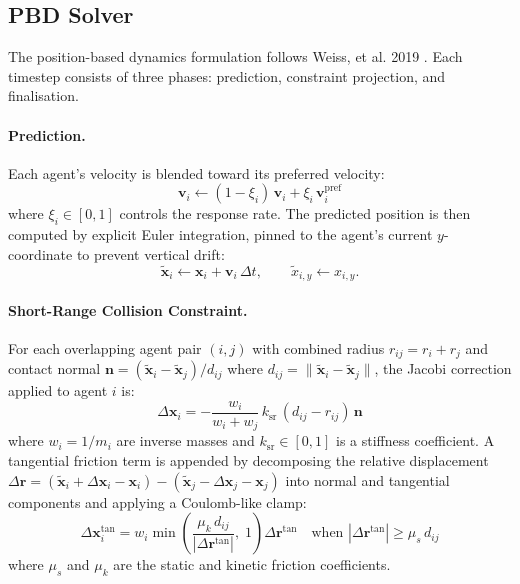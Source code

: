 \subsection{PBD Solver}
\label{sec:pbd_solver}

The position-based dynamics formulation follows Weiss, et al. 2019
\cite{weiss2019}.  Each timestep consists of three phases: prediction,
constraint projection, and finalisation.

\paragraph{Prediction.}
Each agent's velocity is blended toward its preferred velocity:
\begin{equation}
    \mathbf{v}_i \leftarrow (1 - \xi_i)\,\mathbf{v}_i + \xi_i\,\mathbf{v}^{\mathrm{pref}}_i
\end{equation}
where $\xi_i \in [0,1]$ controls the response rate.  The predicted position
is then computed by explicit Euler integration, pinned to the agent's current
$y$-coordinate to prevent vertical drift:
\begin{equation}
    \tilde{\mathbf{x}}_i \leftarrow \mathbf{x}_i + \mathbf{v}_i\,\Delta t, \qquad
    \tilde{x}_{i,y} \leftarrow x_{i,y}.
\end{equation}

\paragraph{Short-Range Collision Constraint.}
For each overlapping agent pair $(i,j)$ with combined radius
$r_{ij} = r_i + r_j$ and contact normal
$\mathbf{n} = (\tilde{\mathbf{x}}_i - \tilde{\mathbf{x}}_j)/d_{ij}$
where $d_{ij} = \|\tilde{\mathbf{x}}_i - \tilde{\mathbf{x}}_j\|$,
the Jacobi correction applied to agent $i$ is:
\begin{equation}
    \Delta\mathbf{x}_i = -\frac{w_i}{w_i + w_j}\,k_{\mathrm{sr}}\,
    (d_{ij} - r_{ij})\,\mathbf{n}
\end{equation}
where $w_i = 1/m_i$ are inverse masses and $k_{\mathrm{sr}} \in [0,1]$ is a
stiffness coefficient.  A tangential friction term is appended by decomposing
the relative displacement $\Delta\mathbf{r} = (\tilde{\mathbf{x}}_i + \Delta\mathbf{x}_i -
\mathbf{x}_i) - (\tilde{\mathbf{x}}_j - \Delta\mathbf{x}_j - \mathbf{x}_j)$
into normal and tangential components and applying a Coulomb-like clamp:
\begin{equation}
    \Delta\mathbf{x}^{\mathrm{tan}}_i =
    w_i \min\!\left(\frac{\mu_k\,d_{ij}}{|\Delta\mathbf{r}^{\mathrm{tan}}|},\;1\right)
    \Delta\mathbf{r}^{\mathrm{tan}}
    \quad \text{when } |\Delta\mathbf{r}^{\mathrm{tan}}| \geq \mu_s\,d_{ij}
\end{equation}
where $\mu_s$ and $\mu_k$ are the static and kinetic friction coefficients.

